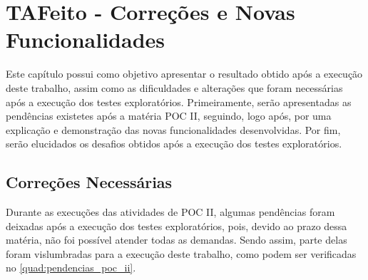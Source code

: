 \chapter{TAFeito - Correções e Novas Funcionalidades}\label{novas_funcionalidades}

Este capítulo possui como objetivo apresentar o resultado obtido após a execução deste trabalho, assim como as dificuldades e alterações que foram necessárias após a execução dos testes exploratórios. Primeiramente, serão apresentadas as pendências existetes após a matéria POC II, seguindo, logo após, por uma explicação e demonstração das novas funcionalidades desenvolvidas. Por fim, serão elucidados os desafios obtidos após a execução dos testes exploratórios.

\section{Correções Necessárias}

Durante as execuções das atividades de POC II, algumas pendências foram deixadas após a execução dos testes exploratórios, pois, devido ao prazo dessa matéria, não foi possível atender todas as demandas. Sendo assim, parte delas foram vislumbradas para a execução deste trabalho, como podem ser verificadas no \autoref{quad:pendencias_poc_ii}.

